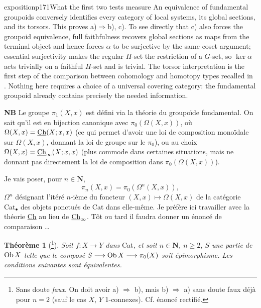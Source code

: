 \begin{dcomment}{exposition}{p171}{What the first two tests measure}
An equivalence of fundamental groupoids conversely identifies every category of local systems, its global sections, and its torsors. This proves a)$\Rightarrow$b), c). To see directly that c) also forces the groupoid equivalence, full faithfulness recovers global sections as maps from the terminal object and hence forces $\alpha$ to be surjective by the same coset argument; essential surjectivity makes the regular $H$-set the restriction of a $G$-set, so $\ker\alpha$ acts trivially on a faithful $H$-set and is trivial. The torsor interpretation is the first step of the comparison between cohomology and homotopy types recalled in \citet[Preface, pp.~vii--viii]{Lurie2009HTT}. Nothing here requires a choice of a universal covering category: the fundamental groupoid already contains precisely the needed information.
\end{dcomment}


\textbf{NB} Le groupe $\pi_1(X,x)$ est défini via la théorie du groupoïde fondamental. On sait qu'il est en bijection canonique avec $\pi_0(\Omega(X,x))$, où $\Omega(X,x) = \underline{\mathrm{Ch}}(X;x,x)$ (ce qui permet d'avoir une loi de composition monoïdale sur $\Omega(X,x)$, donnant la loi de groupe sur le $\pi_0$), ou au choix $\Omega(X,x) = \underline{\mathrm{Ch}}_\infty(X;x,x)$ (plus commode dans certaines situations, mais ne donnant pas directement la loi de composition dans $\pi_0(\Omega(X,x))$).

Je vais poser, pour $n \in \mathbf{N}$,
\[
\pi_n(X,x) = \pi_0(\Omega^n(X,x)),
\]
$\Omega^n$ désignant l'itéré $n$-ième du foncteur $(X,x) \longmapsto \Omega(X,x)$ de la catégorie $\mathrm{Cat}_\bullet$ des objets ponctués de Cat dans elle-même. Je préfère ici travailler avec la théorie \underline{Ch} au lieu de $\underline{\mathrm{Ch}}_\infty$. Tôt ou tard il faudra donner un énoncé de comparaison \dots

\textbf{Théorème 1} (\footnote[112]{Sans doute \textit{faux}. On doit avoir a) $\Longrightarrow$ b), mais b) $\Longrightarrow$ a) sans doute faux déjà pour $n = 2$ (sauf le cas $X$, $Y$ 1-connexes). Cf. énoncé rectifié.}). \textit{Soit $f : X \longrightarrow Y$ dans} Cat\textit{, et soit $n \in \mathbf{N}$, $n \geq 2$, $S$ une partie de} $\mathrm{Ob}\, X$ \textit{telle que le composé $S \longrightarrow \mathrm{Ob}\, X \longrightarrow \pi_0(X)$ soit} \textit{épimorphisme. Les conditions suivantes sont équivalentes.}

